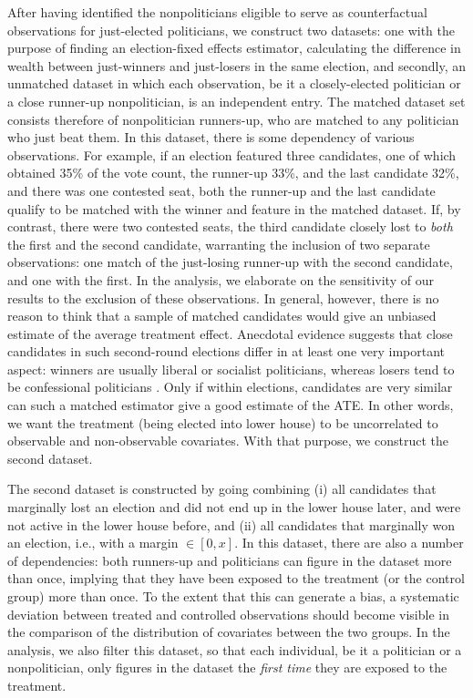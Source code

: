 \documentclass[12pt]{article}
\begin{document}
    After having identified the nonpoliticians eligible to serve as counterfactual observations for just-elected politicians, we construct two datasets: one with the purpose of finding an election-fixed effects estimator, calculating the difference in wealth between just-winners and just-losers in the same election, and secondly, an unmatched dataset in which each observation, be it a closely-elected politician or a close runner-up nonpolitician, is an independent entry. The matched dataset set consists therefore of nonpolitician runners-up, who are matched to any politician who just beat them. In this dataset, there is some dependency of various observations. For example, if an election featured three candidates, one of which obtained 35\% of the vote count, the runner-up 33\%, and the last candidate 32\%, and there was one contested seat, both the runner-up and the last candidate qualify to be matched with the winner and feature in the matched dataset. If, by contrast, there were two contested seats, the third candidate closely lost to \textit{both} the first and the second candidate, warranting the inclusion of two separate observations: one match of the just-losing runner-up with the second candidate, and one with the first. In the analysis, we elaborate on the sensitivity of our results to the exclusion of these observations. In general, however, there is no reason to think that a sample of matched candidates would give an unbiased estimate of the average treatment effect. Anecdotal evidence suggests that close candidates in such second-round elections differ in at least one very important aspect: winners are usually liberal or socialist politicians, whereas losers tend to be confessional politicians \citep{huizinga1979een}. Only if within elections, candidates are very similar can such a matched estimator give a good estimate of the ATE. In other words, we want the treatment (being elected into lower house) to be uncorrelated to observable and non-observable covariates. With that purpose, we construct the second dataset. 

    The second dataset is constructed by going combining (i) all candidates that marginally lost an election and did not end up in the lower house later, and were not active in the lower house before, and (ii) all candidates that marginally won an election, i.e., with a margin $\in [0, x]$. In this dataset, there are also a number of dependencies: both runners-up and politicians can figure in the dataset more than once, implying that they have been exposed to the treatment (or the control group) more than once. To the extent that this can generate a bias, a systematic deviation between treated and controlled observations should become visible in the comparison of the distribution of covariates between the two groups. In the analysis, we also filter this dataset, so that each individual, be it a politician or a nonpolitician, only figures in the dataset the \textit{first time} they are exposed to the treatment. 
\end{document}
